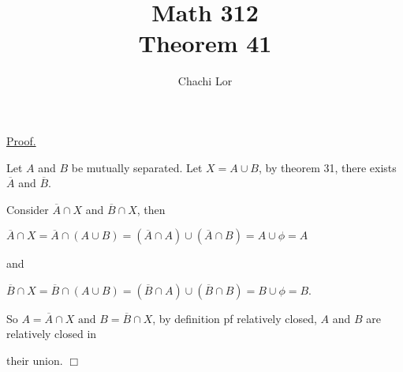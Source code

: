 \documentclass[a4paper]{article}
\title{Math 312\\Theorem 41}
\author{Chachi Lor}
\date{}
\begin{document}
\maketitle
\underline{Proof.}

Let $A$ and $B$ be mutually separated. Let $X = A \cup B$, by theorem 31, there exists $\overline{A}$ and $\overline{B}$.

Consider $\overline{A} \cap X$ and $\overline{B} \cap X$, then
\begin{center}
$\overline{A} \cap X = \overline{A} \cap (A \cup B) = (\overline{A} \cap A) \cup (\overline{A} \cap B) = A \cup \phi = A$
\end{center}

and

\begin{center}
$\overline{B} \cap X = \overline{B} \cap (A \cup B) = (\overline{B} \cap A) \cup (\overline{B} \cap B) = B \cup \phi = B$.
\end{center}

So $A = \overline{A} \cap X \text{ and } B = \overline{B} \cap X$, by definition pf relatively closed, $A$ and 
$B$ are relatively closed in 

their union. $\Box$
\end{document}
